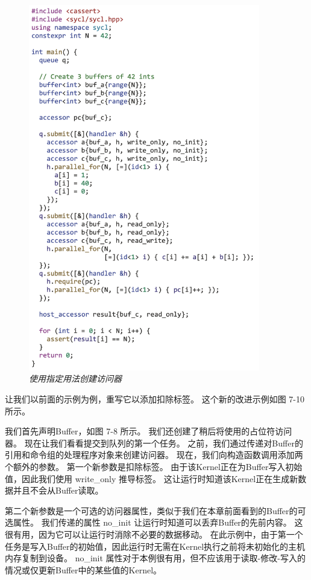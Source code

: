 \begin{figure}[H]
	\centering
	\includegraphics[width=0.9\textwidth]{figs/F7.10.png}
	\caption{\textit{使用指定用法创建访问器 }}
\end{figure}

让我们以前面的示例为例，重写它以添加扣除标签。 这个新的改进示例如图 7-10 所示。

我们首先声明Buffer，如图 7-8 所示。 我们还创建了稍后将使用的占位符访问器。 
现在让我们看看提交到队列的第一个任务。 之前，我们通过传递对Buffer的引用和命令组的处理程序对象来创建访问器。 
现在，我们向构造函数调用添加两个额外的参数。 第一个新参数是扣除标签。 
由于该Kernel正在为Buffer写入初始值，因此我们使用 write\_only 推导标签。 
这让运行时知道该Kernel正在生成新数据并且不会从Buffer读取。

第二个新参数是一个可选的访问器属性，类似于我们在本章前面看到的Buffer的可选属性。 
我们传递的属性 no\_init 让运行时知道可以丢弃Buffer的先前内容。 这很有用，因为它可以让运行时消除不必要的数据移动。 
在此示例中，由于第一个任务是写入Buffer的初始值，因此运行时无需在Kernel执行之前将未初始化的主机内存复制到设备。 
no\_init 属性对于本例很有用，但不应该用于读取-修改-写入的情况或仅更新Buffer中的某些值的Kernel。

